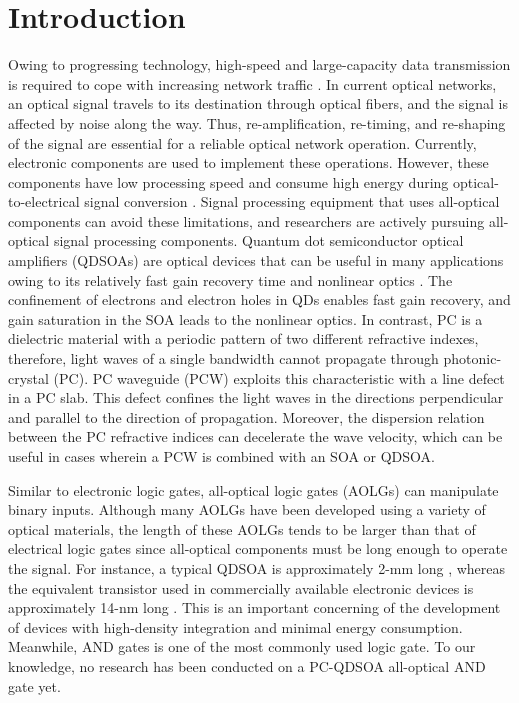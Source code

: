 \documentclass[twocolumn]{el-author}
\begin{document}
\section{Introduction}
Owing to progressing technology, high-speed and large-capacity data transmission is required to cope with increasing network traffic {\cite{qdsoa_ethernet}}. In current optical networks, an optical signal travels to its destination through optical fibers, and the signal is affected by noise along the way. Thus, re-amplification, re-timing, and re-shaping of the signal are essential for a reliable optical network operation. Currently, electronic components are used to implement these operations. However, these components have low processing speed and consume high energy during optical-to-electrical signal conversion {\cite{3r_regeneration}}. Signal processing equipment that uses all-optical components can avoid these limitations, and researchers are actively pursuing all-optical signal processing components.
Quantum dot semiconductor optical amplifiers (QDSOAs) are optical devices that can be useful in many applications owing to its relatively fast gain recovery time and nonlinear optics {\cite{qdsoa_aosp}}. The confinement of electrons and electron holes in QDs enables fast gain recovery, and gain saturation in the SOA leads to the nonlinear optics.
In contrast, PC is a dielectric material with a periodic pattern of two different refractive indexes, therefore, light waves of a single bandwidth cannot propagate through photonic-crystal (PC). PC waveguide (PCW) exploits this characteristic with a line defect in a PC slab. This defect confines the light waves in the directions perpendicular and parallel to the direction of propagation. Moreover, the dispersion relation between the PC refractive indices can decelerate the wave velocity, which can be useful in cases wherein a PCW is combined with an SOA or QDSOA. \par
Similar to electronic logic gates, all-optical logic gates (AOLGs) can manipulate binary inputs. Although many AOLGs have been developed using a variety of optical materials, the length of these AOLGs tends to be larger than that of electrical logic gates since all-optical components must be long enough to operate the signal. For instance, a typical QDSOA is approximately 2-mm long {\cite{qdsoa_nssm}}, whereas the equivalent transistor used in commercially available electronic devices is approximately 14-nm long {\cite{current_cpu}}. This is an important concerning of the development of devices with high-density integration and minimal energy consumption. Meanwhile, AND gates is one of the most commonly used logic gate. To our knowledge, no research has been conducted on a PC-QDSOA all-optical AND gate yet. \par
\end{document}
